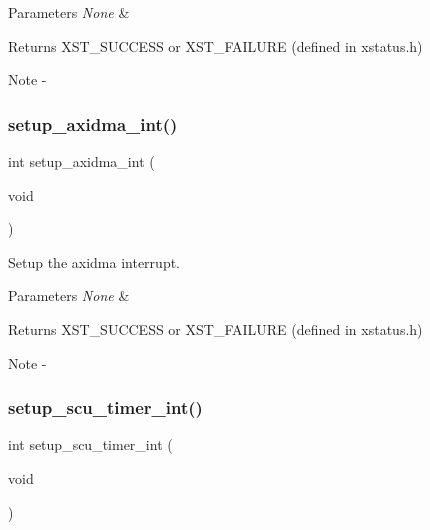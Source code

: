 \begin{DoxyParams}{Parameters}
{\em None} & \\
\hline
\end{DoxyParams}
\begin{DoxyReturn}{Returns}
X\+S\+T\+\_\+\+S\+U\+C\+C\+E\+SS or X\+S\+T\+\_\+\+F\+A\+I\+L\+U\+RE (defined in xstatus.\+h)
\end{DoxyReturn}
\begin{DoxyNote}{Note}
-\/ 
\end{DoxyNote}
\mbox{\label{interrupt_8c_a68fd84cd1e3ae81bf93d17212974ab9a}} 
\subsubsection{setup\_axidma\_int()}
{\footnotesize\ttfamily int setup\+\_\+axidma\+\_\+int (\begin{DoxyParamCaption}\item[{void}]{ }\end{DoxyParamCaption})}



Setup the axidma interrupt. 


\begin{DoxyParams}{Parameters}
{\em None} & \\
\hline
\end{DoxyParams}
\begin{DoxyReturn}{Returns}
X\+S\+T\+\_\+\+S\+U\+C\+C\+E\+SS or X\+S\+T\+\_\+\+F\+A\+I\+L\+U\+RE (defined in xstatus.\+h)
\end{DoxyReturn}
\begin{DoxyNote}{Note}
-\/ 
\end{DoxyNote}
\mbox{\label{interrupt_8c_a592525108f234b17adc80881d9454166}} 
\subsubsection{setup\_scu\_timer\_int()}
{\footnotesize\ttfamily int setup\+\_\+scu\+\_\+timer\+\_\+int (\begin{DoxyParamCaption}\item[{void}]{ }\end{DoxyParamCaption})}




